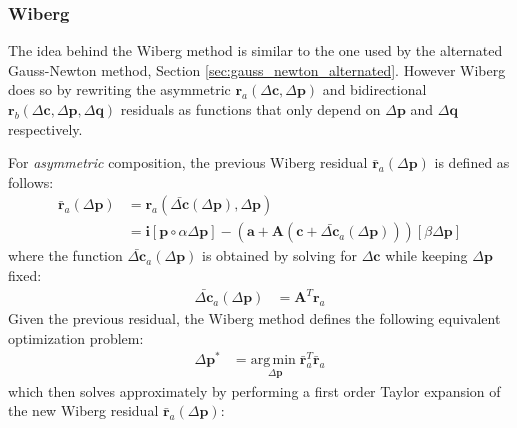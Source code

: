 \subsubsection{Wiberg}
\label{sec:wiberg}

The idea behind the Wiberg method is similar to the one used by the alternated Gauss-Newton method, Section \ref{sec:gauss_newton_alternated}. However Wiberg does so by rewriting the asymmetric $\mathbf{r}_a(\Delta\mathbf{c}, \Delta\mathbf{p})$ and bidirectional $\mathbf{r}_b(\Delta\mathbf{c}, \Delta\mathbf{p},\Delta\mathbf{q})$ residuals as functions that only depend on $\Delta\mathbf{p}$ and $\Delta\mathbf{q}$ respectively.

For \emph{asymmetric} composition, the previous Wiberg residual $\bar{\mathbf{r}}_a (\Delta \mathbf{p})$ is defined as follows:
\begin{equation}
    \begin{aligned}
        \bar{\mathbf{r}}_a (\Delta \mathbf{p}) & = \mathbf{r}_a(\bar{\Delta \mathbf{c}}(\Delta \mathbf{p}), \Delta \mathbf{p})
        \\
        & = \mathbf{i}[\mathbf{p} \circ \alpha \Delta \mathbf{p}] - (\mathbf{a} + \mathbf{A}(\mathbf{c} + \bar{\Delta \mathbf{c}}_a(\Delta \mathbf{p}))) [\beta \Delta\mathbf{p}]
    \label{eq:asymmetric_wiberg_residual}
    \end{aligned}
\end{equation}
where the function $\bar{\Delta \mathbf{c}}_a(\Delta \mathbf{p})$ is obtained by solving for $\Delta\mathbf{c}$ while keeping $\Delta\mathbf{p}$ fixed:
\begin{equation}
    \begin{aligned}
        \bar{\Delta \mathbf{c}}_a(\Delta \mathbf{p}) & = \mathbf{A}^T \mathbf{r}_a
        \label{eq:asymmetric_wiberg_c_function}
    \end{aligned}
\end{equation}
Given the previous residual, the Wiberg method defines the following equivalent optimization problem:
\begin{equation}
    \begin{aligned}
        \Delta\mathbf{p}^* & = \underset{\Delta\mathbf{p}}{\mathrm{arg\,min\;}} \bar{\mathbf{r}}_a^T\bar{\mathbf{r}}_a
    \label{eq:asymmetric_wiberg_problem1}
    \end{aligned}
\end{equation}
which then solves approximately by performing a first order Taylor expansion of the new Wiberg residual $\bar{\mathbf{r}}_a (\Delta \mathbf{p})$:
